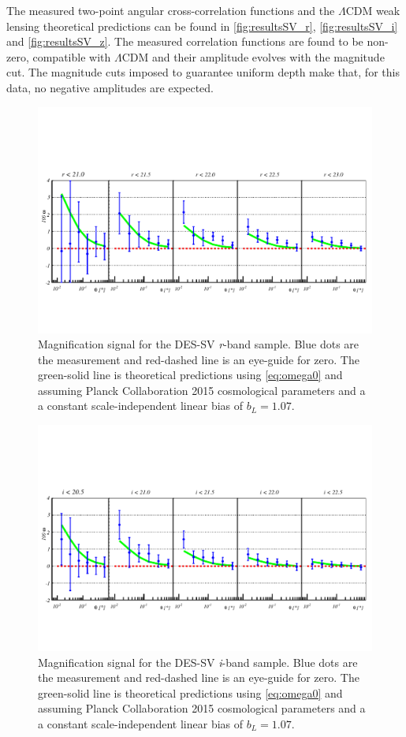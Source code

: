 The measured two-point angular cross-correlation functions and the $\Lambda$CDM weak lensing theoretical predictions can be found in \autoref{fig:resultsSV_r}, \autoref{fig:resultsSV_i} and \autoref{fig:resultsSV_z}. The measured correlation functions are found to be non-zero, compatible with $\Lambda$CDM and their amplitude evolves with the magnitude cut. The magnitude cuts imposed to guarantee uniform depth make that, for this data, no negative amplitudes are expected.
\begin{figure}
\includegraphics[width=\textwidth,trim={0 2.3cm 0 3.5cm},clip]{./figures/mag_r.pdf}
\caption{Magnification signal for the DES-SV {\it r}-band sample. Blue dots are the measurement and red-dashed line is an eye-guide for zero. The green-solid line is theoretical predictions using \autoref{eq:omega0} and assuming Planck Collaboration 2015 cosmological parameters and a a constant scale-independent linear bias of $b_L=1.07$.}
\label{fig:resultsSV_r}
\end{figure}
\begin{figure}
\includegraphics[width=\textwidth,trim={0 2.3cm 0 3.5cm},clip]{./figures/mag_i.pdf}
\caption{Magnification signal for the DES-SV {\it i}-band sample. Blue dots are the measurement and red-dashed line is an eye-guide for zero. The green-solid line is theoretical predictions using \autoref{eq:omega0} and assuming Planck Collaboration 2015 cosmological parameters and a a constant scale-independent linear bias of $b_L=1.07$.}
\label{fig:resultsSV_i}
\end{figure}
